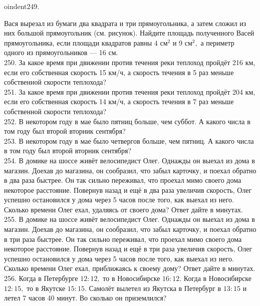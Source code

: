 oindent249. \begin{center}
\begin{figure}[ht!]
\end{figure}
\end{center}
Вася вырезал из бумаги два квадрата и три прямоугольника, а затем сложил из них большой прямоугольник (см. рисунок). Найдите площадь  полученного Васей прямоугольника, если площади квадратов равны $4\text{ см}^2$ и $9\text{ см}^2,$ а периметр одного из прямоугольников --- 16 см.\\
250. За какое время при движении против течения реки теплоход пройдёт 216 км, если его собственная скорость 15 км/ч, а скорость течения в 5 раз меньше собственной скорости теплохода?\\
251. За какое время при движении против течения реки теплоход пройдёт 204 км, если его собственная скорость 14 км/ч, а скорость течения в 7 раз меньше собственной скорости теплохода?\\
252. В некотором году в мае было пятниц больше, чем суббот. А какого числа в том году был второй вторник сентября?\\
253. В некотором году в мае было четвергов больше, чем пятниц. А какого числа в том году был второй вторник сентября?\\
254. В домике на шоссе живёт велосипедист Олег. Однажды он выехал из дома в магазин. Доехав до магазина, он сообразил, что забыл карточку, и поехал обратно в два раза быстрее. Он так сильно переживал, что проехал мимо своего дома некоторое расстояние. Повернув назад и ещё в два раза увеличив скорость, Олег успешно остановился у дома через 5 часов после того, как выехал из него. Сколько времени Олег ехал, удаляясь от своего дома? Ответ дайте в минутах.\\
255. В домике на шоссе живёт велосипедист Олег. Однажды он выехал из дома в магазин. Доехав до магазина, он сообразил, что забыл карточку, и поехал обратно в три раза быстрее. Он так сильно переживал, что проехал мимо своего дома некоторое расстояние. Повернув назад и ещё в три раза увеличив скорость, Олег успешно остановился у дома через 5 часов после того, как выехал из него. Сколько времени Олег ехал, приближаясь к своему дому? Ответ дайте в минутах.\\
256. Когда в Петербурге $12:12,$ то в Новосибирске $16:12.$ Когда в Новосибирске $12:15,$ то в Якутске $15:15.$ Самолёт вылетел из Якутска в Петербург в $13:15$ и летел 7 часов 40 минут. Во сколько он приземлился?\\
